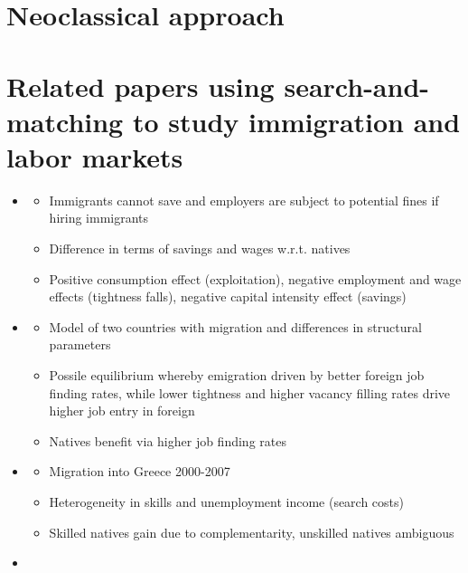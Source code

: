 \documentclass[12pt]{article}
\begin{document}
\section{Neoclassical approach }

\section{Related papers using search-and-matching to study immigration and labor markets}

\begin{itemize}
    \item \textcite{liu_JEDC_2000_illegal_immigration_search_welfare}
    \begin{itemize}
        \item Immigrants cannot save and employers are subject to potential fines if hiring immigrants
        \item Difference in terms of savings and wages w.r.t. natives
        \item Positive consumption effect (exploitation), negative employment and wage effects (tightness falls), negative capital intensity effect (savings)
    \end{itemize}
    \item \textcite{ortega_EJ_2000_two_country_migration_search_multiple_equilibria}
    \begin{itemize}
        \item Model of two countries with migration and differences in structural parameters
        \item Possile equilibrium whereby emigration driven by better foreign job finding rates, while lower tightness and higher vacancy filling rates drive higher job entry in foreign
        \item Natives benefit via higher job finding rates
    \end{itemize}
    \item \textcite{chassamboulli_palivos_JoMacro_2013_impact_immigration_employment_wages}
    \begin{itemize}
        \item Migration into Greece 2000-2007
        \item Heterogeneity in skills and unemployment income (search costs)
        \item Skilled natives gain due to complementarity, unskilled natives ambiguous
    \end{itemize}
    \item \textcite{chassamboulli_palivos_IER_2014_us_skill_biased_immigration_search}

\end{itemize}
\end{document}
